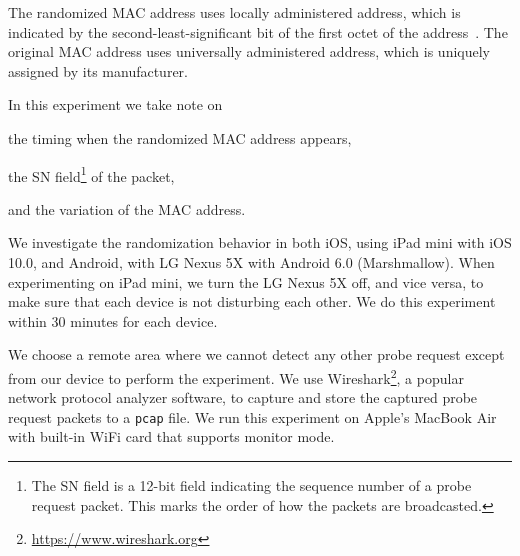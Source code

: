 The randomized \ac{MAC} address uses locally administered address, which is indicated by the second-least-significant bit of the first octet of the address~\cite{thesis082}. The original \ac{MAC} address uses universally administered address, which is uniquely assigned by its manufacturer.

In this experiment we take note on 
\begin{enumerate*}[label={\alph*)},font={\color{red!50!black}\bfseries}]
  \item the timing when the randomized MAC address appears,
  \item the \ac{SN} field\footnote{The \ac{SN} field is a 12-bit field indicating the sequence number of a probe request packet. This marks the order of how the packets are broadcasted.} of the packet,
  \item and the variation of the \ac{MAC} address.
\end{enumerate*}

We investigate the randomization behavior in both iOS, using iPad mini with iOS 10.0, and Android, with LG Nexus 5X with Android 6.0 (Marshmallow). When experimenting on iPad mini, we turn the LG Nexus 5X off, and vice versa, to make sure that each device is not disturbing each other. We do this experiment within 30 minutes for each device.

We choose a remote area where we cannot detect any other probe request except from our device to perform the experiment. We use Wireshark\footnote{\url{https://www.wireshark.org}}, a popular network protocol analyzer software, to capture and store the captured probe request packets to a \verb|pcap| file. We run this experiment on Apple's MacBook Air with built-in WiFi card that supports monitor mode.











